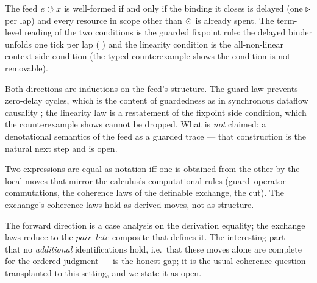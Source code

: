 \documentclass{eptcs}
\begin{document}
\begin{claim}\label{cl:feed}\claimS
The feed $e \circlearrowleft x$ is well-formed if and only if the binding it
closes is delayed (one $\triangleright$ per lap) and every resource in scope
other than $\odot$ is already spent. The term-level reading of the
two conditions is the guarded fixpoint rule: the delayed binder unfolds
one tick per lap ( ) and
the linearity condition is the all-non-linear context side condition
(the typed counterexample 
 shows the condition is not removable).
\end{claim}
\begin{proofsketch}
Both directions are inductions on the feed's structure. The guard law
prevents zero-delay cycles, which is the content of guardedness as in
synchronous dataflow causality \cite{lustre1991}; the linearity law is
a restatement of the fixpoint side condition, which the counterexample
shows cannot be dropped. What is \emph{not} claimed: a denotational
semantics of the feed as a guarded trace \cite{jsv1996,birkedal2012}
--- that construction is the natural next step and is open.
\end{proofsketch}

\begin{claim}[equivalence]\label{cl:eq}\claimS
Two expressions are equal as
notation iff one is obtained from the other by the local moves that mirror the calculus's
computational rules (guard--operator commutations, the coherence laws of the definable
exchange, the cut). The exchange's coherence laws hold as derived
moves, not as structure.
\end{claim}
\begin{proofsketch}
The forward direction is a case analysis on the derivation equality; the
exchange laws reduce to the $\mathit{pair}$--$\mathit{lete}$ composite
that defines it. The interesting part --- that no \emph{additional}
identifications hold, i.e.\ that these moves alone are complete for the
ordered judgment --- is the honest gap; it is the
usual coherence question \cite{joyal1991,selinger2011} transplanted to
this setting, and we state it as open.
\end{proofsketch}
\end{document}
